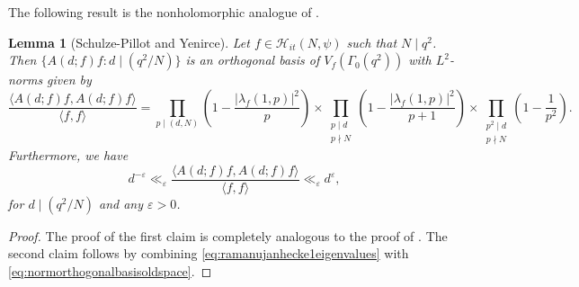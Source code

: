 \documentclass{article}
\newtheorem{lem}[thm]{Lemma}
\theoremstyle{named}
\newcommand{\HH}{\mathcal{H}}
\begin{document}
The following result is the nonholomorphic analogue of \cite[Theorem 3.2]{Schulze_Pillot_Petersson}.
\begin{lem}[Schulze-Pillot and Yenirce]\label{lem:orthogonalbasisschulzepillot}
Let $f \in \HH_{it}(N, \psi)$ such that $N \mid q^2$. Then $\{A(d; f)f : d \mid (q^2/N)\}$ is an orthogonal basis of $V_f(\Gamma_0(q^2))$ with $L^2$-norms given by 
\begin{equation}\label{eq:normorthogonalbasisoldspace}
\frac{\langle A(d; f)f, A(d; f)f \rangle }{ \langle f, f \rangle} = \prod_{p \mid (d, N)}\left(1 - \frac{|\lambda_f(1, p)|^2}{p}\right) \times \prod_{\substack{p \mid d\\p \nmid N}}\left(1 - \frac{|\lambda_f(1, p)|^2}{p + 1}\right)\times \prod_{\substack{p^2 \mid d\\ p \nmid N}} \left(1 - \frac{1}{p^2}\right).
\end{equation}
Furthermore, we have
\begin{equation}\label{eq:estimatenormorthogonalbasisoldspace}
    d^{-\varepsilon} \ll_{\varepsilon} \frac{\langle A(d; f)f, A(d; f)f \rangle}{ \langle f, f \rangle} \ll_{\varepsilon} d^\varepsilon,
\end{equation}
for $d \mid (q^2/N)$ and any $\varepsilon > 0$.
\end{lem}
\begin{proof}
The proof of the first claim is completely analogous to the proof of \cite[Theorem 3.2]{Schulze_Pillot_Petersson}. The second claim follows by combining  \eqref{eq:ramanujanhecke1eigenvalues} with \eqref{eq:normorthogonalbasisoldspace}.
\end{proof}
\end{document}

